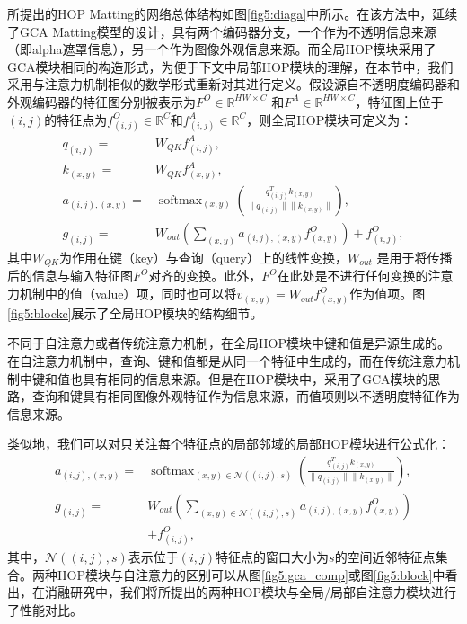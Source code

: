 所提出的HOP Matting的网络总体结构如图\ref{fig5:diaga}中所示。在该方法中，延续了GCA Matting模型的设计，具有两个编码器分支，一个作为不透明信息来源（即alpha遮罩信息），另一个作为图像外观信息来源。而全局HOP模块采用了GCA模块相同的构造形式，为便于下文中局部HOP模块的理解，在本节中，我们采用与注意力机制相似的数学形式重新对其进行定义。假设源自不透明度编码器和外观编码器的特征图分别被表示为$F^O\in\mathbb{R}^{HW\times C}$ 和$F^A\in\mathbb{R}^{HW\times C}$，特征图上位于 $(i,j)$的特征点为$f^O_{(i,j)}\in\mathbb{R}^{C}$和$f^A_{(i,j)}\in\mathbb{R}^{C}$，则全局HOP模块可定义为：
\begin{equation}
\begin{aligned}
q_{(i,j)} =& W_{QK}f^A_{(i,j)},\\ 
k_{(x,y)} =& W_{QK}f^A_{(x,y)}, \\
a_{(i,j),(x,y)} =& \mathop{\mathrm{softmax}}_{(x,y)}(\frac{q_{(i,j)}^Tk_{(x,y)}}{\|q_{(i,j)}\|\|k_{(x,y)}\|}),\\
g_{(i,j)} =& W_{out}(\sum_{(x,y)}a_{(i,j),(x,y)}f^O_{(x,y)}) + f^O_{(i,j)},
\end{aligned}
\end{equation}
其中$W_{QK}$为作用在键（key）与查询（query）上的线性变换，$W_{out}$ 是用于将传播后的信息与输入特征图$F^O$对齐的变换。此外，$F^O$在此处是不进行任何变换的注意力机制中的值（value）项，同时也可以将$v_{(x,y)}=W_{out}f^O_{(x,y)}$作为值项。图\ref{fig5:blockc}展示了全局HOP模块的结构细节。

不同于自注意力\cite{lin2017structured,vaswani2017attention}或者传统注意力机制\cite{bahdanau2014neural,xu2015show}，在全局HOP模块中键和值是异源生成的。在自注意力机制中，查询、键和值都是从同一个特征中生成的，而在传统注意力机制中键和值也具有相同的信息来源。但是在HOP模块中，采用了GCA模块的思路，查询和键具有相同图像外观特征作为信息来源，而值项则以不透明度特征作为信息来源。

类似地，我们可以对只关注每个特征点的局部邻域的局部HOP模块进行公式化：
\begin{equation}
\begin{aligned}
a_{(i,j),(x,y)} = &\mathop{\mathrm{softmax}}_{(x,y)\in\mathcal{N}((i,j), s)}(\frac{q_{(i,j)}^Tk_{(x,y)}}{\|q_{(i,j)}\|\|k_{(x,y)}\|}),\\
g_{(i,j)} = &W_{out}(\sum_{(x,y)\in\mathcal{N}((i,j), s)}a_{(i,j),(x,y)}f^O_{(x,y)})\\& + f^O_{(i,j)},
\end{aligned}
\end{equation}
其中，$\mathcal{N}((i,j), s)$表示位于$(i,j)$特征点的窗口大小为$s$的空间近邻特征点集合。两种HOP模块与自注意力的区别可以从图\ref{fig5:gca_comp}或图\ref{fig5:block}中看出，在消融研究中，我们将所提出的两种HOP模块与全局/局部自注意力模块进行了性能对比。

